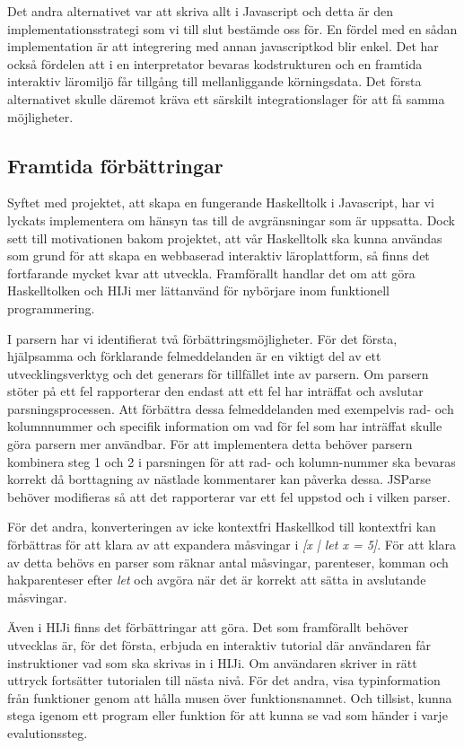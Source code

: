 Det andra alternativet var att skriva allt i Javascript och detta är den
implementationsstrategi som vi till slut bestämde oss för.
En fördel med en sådan implementation är att integrering med annan
javascriptkod blir enkel.
Det har också fördelen att i en interpretator bevaras kodstrukturen och en framtida interaktiv läromiljö får tillgång till mellanliggande körningsdata.
Det första alternativet skulle däremot kräva ett
särskilt integrationslager för att få samma möjligheter.



\subsection{Framtida förbättringar}

Syftet med projektet, att skapa en fungerande Haskelltolk i Javascript, har vi lyckats implementera om hänsyn tas till de avgränsningar som är uppsatta. Dock sett till motivationen bakom projektet, att vår Haskelltolk ska kunna användas som grund för att skapa en webbaserad interaktiv läroplattform, så finns det fortfarande mycket kvar att utveckla. Framförallt handlar det om att göra Haskelltolken och HIJi mer lättanvänd för nybörjare inom funktionell programmering.

I parsern har vi identifierat två förbättringsmöjligheter. För det första, hjälpsamma och förklarande felmeddelanden är en viktigt del av ett utvecklingsverktyg och det generars för tillfället inte av parsern. 
Om parsern stöter på ett fel rapporterar den endast att ett fel har inträffat och avslutar parsningsprocessen. 
Att förbättra dessa felmeddelanden med exempelvis rad- och kolumnnummer och specifik information om vad för fel som har inträffat skulle göra parsern mer användbar.
För att implementera detta behöver parsern kombinera steg 1 och 2 i parsningen för att rad- och kolumn-nummer ska bevaras korrekt då borttagning av nästlade kommentarer kan påverka dessa.
JSParse behöver modifieras så att det rapporterar var ett fel uppstod och i vilken parser.

För det andra, konverteringen av icke kontextfri Haskellkod till kontextfri kan förbättras 
för att klara av att expandera måsvingar i \emph{[x | let x = 5]}. 
För att klara av detta behövs en parser som räknar antal måsvingar, parenteser, 
komman och hakparenteser efter \emph{let} och avgöra när det är korrekt att sätta in avslutande måsvingar.

Även i HIJi finns det förbättringar att göra.
Det som framförallt behöver utvecklas är, för det första, erbjuda en interaktiv tutorial där användaren får instruktioner vad som ska skrivas in i HIJi. Om användaren skriver in rätt uttryck fortsätter tutorialen till nästa nivå.
För det andra, visa typinformation från funktioner genom att hålla musen över funktionsnamnet.
Och tillsist, kunna stega igenom ett program eller funktion för att kunna se vad som händer i varje evalutionssteg. 

